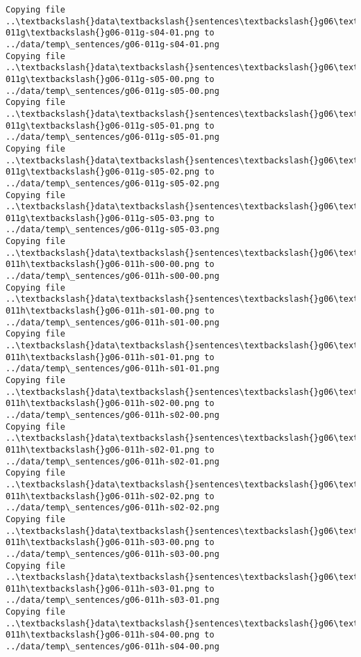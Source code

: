 \documentclass[11pt]{article}
\begin{document}
\begin{Verbatim}[commandchars=\\\{\}]
Copying file ..\textbackslash{}data\textbackslash{}sentences\textbackslash{}g06\textbackslash{}g06-011g\textbackslash{}g06-011g-s04-01.png to
../data/temp\_sentences/g06-011g-s04-01.png
Copying file ..\textbackslash{}data\textbackslash{}sentences\textbackslash{}g06\textbackslash{}g06-011g\textbackslash{}g06-011g-s05-00.png to
../data/temp\_sentences/g06-011g-s05-00.png
Copying file ..\textbackslash{}data\textbackslash{}sentences\textbackslash{}g06\textbackslash{}g06-011g\textbackslash{}g06-011g-s05-01.png to
../data/temp\_sentences/g06-011g-s05-01.png
Copying file ..\textbackslash{}data\textbackslash{}sentences\textbackslash{}g06\textbackslash{}g06-011g\textbackslash{}g06-011g-s05-02.png to
../data/temp\_sentences/g06-011g-s05-02.png
Copying file ..\textbackslash{}data\textbackslash{}sentences\textbackslash{}g06\textbackslash{}g06-011g\textbackslash{}g06-011g-s05-03.png to
../data/temp\_sentences/g06-011g-s05-03.png
Copying file ..\textbackslash{}data\textbackslash{}sentences\textbackslash{}g06\textbackslash{}g06-011h\textbackslash{}g06-011h-s00-00.png to
../data/temp\_sentences/g06-011h-s00-00.png
Copying file ..\textbackslash{}data\textbackslash{}sentences\textbackslash{}g06\textbackslash{}g06-011h\textbackslash{}g06-011h-s01-00.png to
../data/temp\_sentences/g06-011h-s01-00.png
Copying file ..\textbackslash{}data\textbackslash{}sentences\textbackslash{}g06\textbackslash{}g06-011h\textbackslash{}g06-011h-s01-01.png to
../data/temp\_sentences/g06-011h-s01-01.png
Copying file ..\textbackslash{}data\textbackslash{}sentences\textbackslash{}g06\textbackslash{}g06-011h\textbackslash{}g06-011h-s02-00.png to
../data/temp\_sentences/g06-011h-s02-00.png
Copying file ..\textbackslash{}data\textbackslash{}sentences\textbackslash{}g06\textbackslash{}g06-011h\textbackslash{}g06-011h-s02-01.png to
../data/temp\_sentences/g06-011h-s02-01.png
Copying file ..\textbackslash{}data\textbackslash{}sentences\textbackslash{}g06\textbackslash{}g06-011h\textbackslash{}g06-011h-s02-02.png to
../data/temp\_sentences/g06-011h-s02-02.png
Copying file ..\textbackslash{}data\textbackslash{}sentences\textbackslash{}g06\textbackslash{}g06-011h\textbackslash{}g06-011h-s03-00.png to
../data/temp\_sentences/g06-011h-s03-00.png
Copying file ..\textbackslash{}data\textbackslash{}sentences\textbackslash{}g06\textbackslash{}g06-011h\textbackslash{}g06-011h-s03-01.png to
../data/temp\_sentences/g06-011h-s03-01.png
Copying file ..\textbackslash{}data\textbackslash{}sentences\textbackslash{}g06\textbackslash{}g06-011h\textbackslash{}g06-011h-s04-00.png to
../data/temp\_sentences/g06-011h-s04-00.png

\end{Verbatim}
\end{document}
